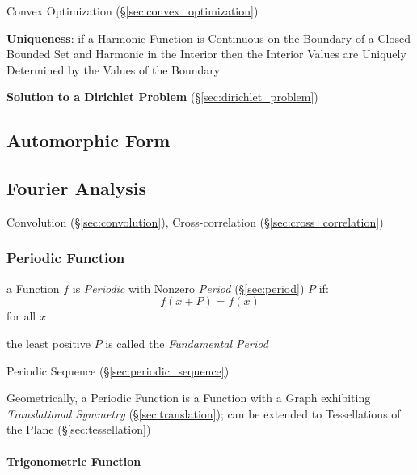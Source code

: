 Convex Optimization (\S\ref{sec:convex_optimization})


\textbf{Uniqueness}: if a Harmonic Function is Continuous on the
Boundary of a Closed Bounded Set and Harmonic in the Interior then the
Interior Values are Uniquely Determined by the Values of the Boundary


\textbf{Solution to a Dirichlet Problem}
(\S\ref{sec:dirichlet_problem})



\subsection{Automorphic Form}\label{sec:automorphic_form}

\subsection{Fourier Analysis}\label{sec:fourier_analysis}

\fist Convolution (\S\ref{sec:convolution}), Cross-correlation
(\S\ref{sec:cross_correlation})



\subsubsection{Periodic Function}\label{sec:periodic_function}

a Function $f$ is \emph{Periodic} with Nonzero \emph{Period}
(\S\ref{sec:period}) $P$ if:
\[
  f(x+P) = f(x)
\]
for all $x$

the least positive $P$ is called the \emph{Fundamental Period}

\fist Periodic Sequence (\S\ref{sec:periodic_sequence})

Geometrically, a Periodic Function is a Function with a Graph exhibiting
\emph{Translational Symmetry} (\S\ref{sec:translation});
can be extended to Tessellations of the Plane (\S\ref{sec:tessellation})



\paragraph{Trigonometric Function}\label{sec:trigonometric_function}\hfill

